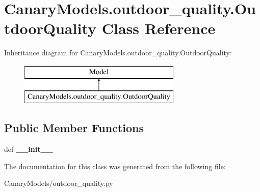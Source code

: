 \hypertarget{class_canary_models_1_1outdoor__quality_1_1_outdoor_quality}{\section{Canary\-Models.\-outdoor\-\_\-quality.\-Outdoor\-Quality Class Reference}
\label{class_canary_models_1_1outdoor__quality_1_1_outdoor_quality}
}
Inheritance diagram for Canary\-Models.\-outdoor\-\_\-quality.\-Outdoor\-Quality\-:\begin{figure}[H]
\begin{center}
\leavevmode
\includegraphics[height=2.000000cm]{class_canary_models_1_1outdoor__quality_1_1_outdoor_quality}
\end{center}
\end{figure}
\subsection*{Public Member Functions}
\begin{DoxyCompactItemize}
\item 
\hypertarget{class_canary_models_1_1outdoor__quality_1_1_outdoor_quality_a4808ccbee5267ca4ca166d3251db2d3c}{def {\bfseries \-\_\-\-\_\-init\-\_\-\-\_\-}}\label{class_canary_models_1_1outdoor__quality_1_1_outdoor_quality_a4808ccbee5267ca4ca166d3251db2d3c}

\end{DoxyCompactItemize}


The documentation for this class was generated from the following file\-:\begin{DoxyCompactItemize}
\item 
Canary\-Models/outdoor\-\_\-quality.\-py\end{DoxyCompactItemize}
